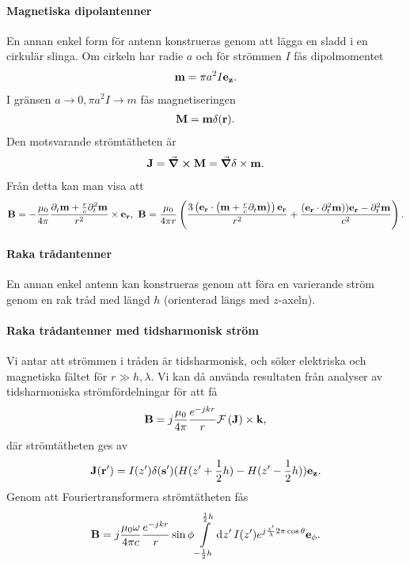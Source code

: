 \paragraph{Magnetiska dipolantenner}
En annan enkel form för antenn konstrueras genom att lägga en sladd i en cirkulär slinga. Om cirkeln har radie $a$ och för strömmen $I$ fås dipolmomentet
\begin{align*}
	\vb{m} = \pi a^{2}I\ub{z}.
\end{align*}
I gränsen $a\to 0, \pi a^{2}I\to m$ fås magnetiseringen
\begin{align*}
	\vb{M} = \vb{m}\delta(\vb{r}).
\end{align*}
Den motsvarande strömtätheten är
\begin{align*}
	\vb{J} = \curl{\vb{M}} = \grad{\delta}\times\vb{m}.
\end{align*}
Från detta kan man visa att
\begin{align*}
	\vb{B} = -\frac{\mu_{0}}{4\pi}\frac{\del{t}{\vb{m}} + \frac{r}{c}\del[2]{t}{\vb{m}}}{r^{2}}\times\ub{r},\ \vb{B} = \frac{\mu_{0}}{4\pi r}\left(\frac{3\left(\ub{r}\cdot\left(\vb{m} + \frac{r}{c}\del{t}{\vb{m}}\right)\right)\ub{r}}{r^{2}} + \frac{(\ub{r}\cdot\del[2]{t}{\vb{m}}))\ub{r} - \del[2]{t}{\vb{m}}}{c^{2}}\right).
\end{align*}

\paragraph{Raka trådantenner}
En annan enkel antenn kan konstrueras genom att föra en varierande ström genom en rak tråd med längd $h$ (orienterad längs med $z$-axeln).

\paragraph{Raka trådantenner med tidsharmonisk ström}
Vi antar att strömmen i tråden är tidsharmonisk, och söker elektriska och magnetiska fältet för $r \gg h, \lambda$. Vi kan då använda resultaten från analyser av tidsharmoniska strömfördelningar för att få
\begin{align*}
	\vb{B} = j\frac{\mu_{0}}{4\pi}\frac{e^{-jkr}}{r}\fou{\vb{J}}\times\vb{k},
\end{align*}
där strömtätheten ges av
\begin{align*}
	\vb{J}(\vb{r}') = I(z')\delta(\vb{s}')(H(z' + \frac{1}{2}h) - H(z' - \frac{1}{2}h))\ub{z}.
\end{align*}
Genom att Fouriertransformera strömtätheten fås
\begin{align*}
	\vb{B} = j\frac{\mu_{0}\omega}{4\pi c}\frac{e^{-jkr}}{r}\sin{\phi}\integ{-\frac{1}{2}h}{\frac{1}{2}h}{z'}{I(z')e^{j\frac{z'}{\lambda}2\pi\cos{\theta}}}\ub{\phi}.
\end{align*}

